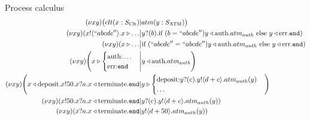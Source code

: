 \begin{frame}{Process calculus}
  \begin{align*}
    (\nu xy)\bigl(clt(x: S_\text{Clt})                                                                  & | atm(y: S_\text{ATM})\bigr)                                                                                                             \\
    (\nu xy)(x!\langle ``abcde'' \rangle. x \triangleright \ldots                                       & \big| y?(b). \text{if } (b = ``abcde'') y \triangleleft \text{auth}. atm_{auth}  \text{ else } y \triangleleft \text{err}.\texttt{end})  \\
    (\nu xy)(x \triangleright \ldots                                                                    & \big| \text{if } (``abcde'' = ``abcde'') y \triangleleft \text{auth}. atm_{auth}  \text{ else } y \triangleleft \text{err}.\texttt{end}) \\
    (\nu xy)\Biggl(x \triangleright  \begin{cases}
                                       \text{auth:} \ldots \\
                                       \text{err:} \texttt{end}
                                     \end{cases}                                                      & \Bigg|  y \triangleleft \text{auth}. atm_{auth}\Biggr)                                                                                     \\
    (\nu xy)\Biggl(x\triangleleft \text{deposit}. x!50.x?a.x\triangleleft \text{terminate}.\texttt{end} & | y \triangleright
    \begin{cases}
      \text{deposit:} y?(c).y!\langle d+c \rangle.atm_{auth}(y) \\
      \ldots
    \end{cases}\Biggr)                                                                                                                                                                                      \\
    (\nu xy)(x!50.x?a.x\triangleleft \text{terminate}.\texttt{end}                                      & | y?(c).y!\langle d+c \rangle.atm_{auth}(y))                                                                                             \\
    (\nu xy)(x?a.x\triangleleft \text{terminate}.\texttt{end}                                           & | y!\langle d+50 \rangle.atm_{auth}(y))                                                                                                  \\

\end{align*}
\end{frame}
